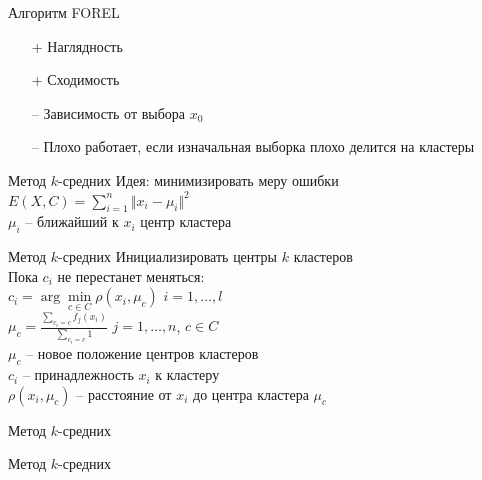 \documentclass[10pt]{beamer}
\begin{document}
\begin{frame}{Алгоритм FOREL}
	\begin{itemize}
		\item[+] Наглядность
		\item[+] Сходимость
		\item[--] Зависимость от выбора $x_0$
		\item[--] Плохо работает, если изначальная выборка плохо делится на кластеры
	\end{itemize}
\end{frame}

\begin{frame}{Метод $k$-средних}
	\alert{Идея}:  минимизировать меру ошибки\\
	\bigbreak
	${E(X, C) = \sum\limits_{i = 1}^n \Vert x_i -\mu_i \Vert^2}$\\
	\bigbreak
	$\mu_i$ -- ближайший к $x_i$ центр кластера
\end{frame}

\begin{frame}{Метод $k$-средних}
	Инициализировать центры $k$ кластеров \\
	\vspace{2mm}
	Пока $c_i$ не перестанет меняться:\\
	\hspace{5mm} $c_i = \arg\min\limits_{c \in C} \rho(x_i, \mu_c)$ \hspace{5mm} $i = 1,\dots, l$\\
	\vspace{2mm}\hspace{5mm} ${\mu_c = \frac{\sum\limits_{c_i = c} f_j(x_i)}{\sum\limits_{c_i = c} 1} }$ \hspace{10mm} $j = 1,\dots, n$, $c \in C$\\
	\vspace{2mm}
	$\mu_c$ -- новое положение центров кластеров\\
	$c_i$ -- принадлежность $x_i$ к кластеру\\
	$\rho(x_i, \mu_c)$ -- расстояние от $x_i$ до центра кластера $\mu_c$
\end{frame}

\begin{frame}{Метод $k$-средних}
\end{frame}

\begin{frame}{Метод $k$-средних}
\end{frame}
\end{document}
